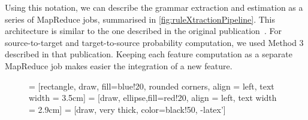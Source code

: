 Using this notation, %
we can describe the grammar extraction and estimation
as a series of MapReduce jobs, summarised in
\autoref{fig:ruleXtractionPipeline}. This architecture is similar
to the one described in the original
publication~\citep{dyer-cordova-mont-lin:2008:WMT}. For
source-to-target and target-to-source probability computation,
we used Method 3 described in that publication. Keeping each
feature computation as a separate MapReduce job makes easier
the integration of a new feature.
%
\begin{figure}
   = [rectangle, draw, fill=blue!20, rounded corners,
    align = left, text width = 3.5cm]
   = [draw, ellipse,fill=red!20,
    align = left, text width = 2.9cm]
   = [draw, very thick, color=black!50, -latex']


\end{figure}
